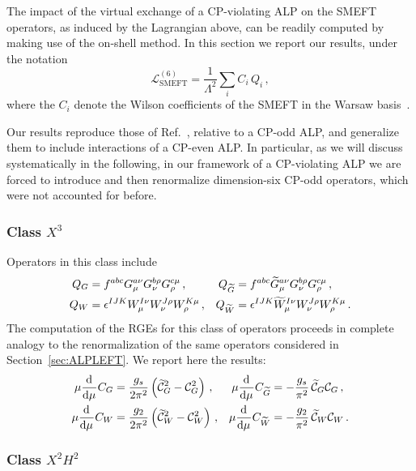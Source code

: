 The impact of the virtual exchange of a CP-violating ALP on the SMEFT operators, as induced by
the Lagrangian above, can be readily computed by making use of the on-shell method.
In this section we report our results, under the notation
\begin{equation}
\mathcal L_{\text{SMEFT}}^{(6)} = \frac{1}{\Lambda^2} \sum_i C_i \,Q_i \,,
\end{equation}
where the $C_i$ denote the Wilson coefficients of the SMEFT in the Warsaw
basis~\cite{Grzadkowski:2010es}.

Our results reproduce those of Ref.~\cite{Galda:2021hbr}, relative to a CP-odd ALP, and
generalize them to include interactions of a CP-even ALP.
In particular, as we will discuss systematically in the following, in our framework of a
CP-violating ALP we are forced to introduce and then renormalize dimension-six CP-odd
operators, which were not accounted for before.

\subsubsection{\texorpdfstring{Class $X^3$}{Class X3}}

Operators in this class include
\begin{align}
Q_G &= f^{abc} G_\mu^{a\nu}G_\nu^{b \rho}G_\rho^{c\mu}\,,  & Q_{\widetilde{G}} &= f^{abc} \widetilde G_\mu^{a\nu}G_\nu^{b \rho}G_\rho^{c\mu}\,,  \\
Q_W &= \epsilon^{IJK} W_\mu^{I\nu}W_\nu^{J \rho}W_\rho^{K\mu}\,,  & Q_{\widetilde{W}} &= \epsilon^{IJK} \widetilde{W}_\mu^{I\nu}W_\nu^{J \rho}W_\rho^{K\mu}\,.
\end{align}
The computation of the RGEs for this class of operators proceeds in complete analogy to the
renormalization of the same operators considered in Section~\ref{sec:ALPLEFT}.
We report here the results:
\begin{align}
\mu\dv[]{}{\mu}{C}_G &= \frac{g_s}{2\pi^2}   \left(\widetilde{\mathcal{C}}_{G}^2 - \mathcal{C}^2_{G} \right)\,, & \mu\dv[]{}{\mu}{C}_{\widetilde{G}} &= -\frac{g_s}{\pi^2}  \,\widetilde{\mathcal{C}}_{G}\mathcal{C}_{G}\,,  \\
\mu\dv[]{}{\mu}{C}_W &=\frac{g_2}{2\pi^2}   \left(\widetilde{\mathcal{C}}_{W}^2 - \mathcal{C}^2_{W} \right)\,, & \mu\dv[]{}{\mu}{C}_{\widetilde{W}} &= -\frac{g_2}{\pi^2} \, \widetilde{\mathcal{C}}_{W}\mathcal{C}_{W}  \,.
\end{align}

\subsubsection{\texorpdfstring{Class $X^2 H^2$}{Class X2H2}}

